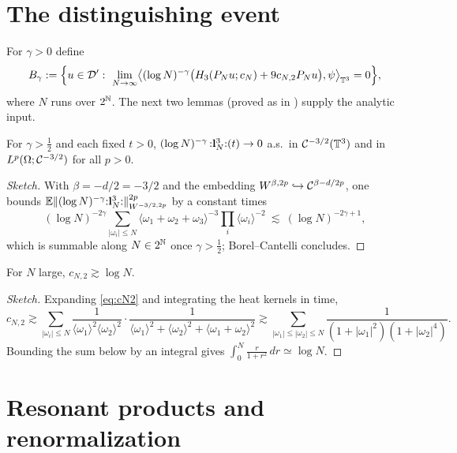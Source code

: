 \section*{The distinguishing event}

For $\gamma>0$ define
\[
B_\gamma:=\Bigl\{u\in\qoneD':\ \lim_{N\to\infty}\bigl\langle(\log N)^{-\gamma}\bigl(\qoneHp_3(\qonePN u;c_N)+9c_{N,2}\qonePN u\bigr),\psi\bigr\rangle_{\qoneT^3}=0\Bigr\},
\]
where $N$ runs over $2^{\mathbb{N}}$. The next two lemmas (proved as in
\cite[Lems.~3.11--3.12]{HKN24}) supply the analytic input.

\begin{qonelemma}\label{lem:cube}
For $\gamma>\tfrac12$ and each fixed $t>0$,
$(\log N)^{-\gamma}\,{:}\mathbf{l}_N^3{:}(t)\to0$ a.s.\ in $\mathcal{C}^{-3/2}(\mathbb{T}^3)$ and in
$L^p(\Omega;\mathcal{C}^{-3/2})$ for all $p>0$.
\end{qonelemma}

\begin{proof}[Sketch]
With $\beta=-d/2=-3/2$ and the embedding $W^{\beta,2p}\hookrightarrow
\mathcal{C}^{\beta-d/2p}$, one bounds
$\mathbb{E}\|(\log N)^{-\gamma}{:}\mathbf{l}_N^3{:}\|_{W^{-3/2,2p}}^{2p}$ by a constant times
\[
(\log N)^{-2\gamma}\sum_{|\omega_i|\le N}\langle\omega_1+\omega_2+\omega_3\rangle^{-3}\prod_{i}\langle\omega_i\rangle^{-2}
\ \lesssim\ (\log N)^{-2\gamma+1},
\]
which is summable along $N\in2^{\mathbb{N}}$ once $\gamma>\tfrac12$; Borel--Cantelli
concludes.
\end{proof}

\begin{qonelemma}\label{lem:logdiv}
For $N$ large, $c_{N,2}\gtrsim\log N$.
\end{qonelemma}

\begin{proof}[Sketch]
Expanding \eqref{eq:cN2} and integrating the heat kernels in time,
\[
c_{N,2}\gtrsim\sum_{|\omega_i|\le N}\frac{1}{\langle\omega_1\rangle^2\langle\omega_2\rangle^2}\cdot\frac{1}{\langle\omega_1\rangle^2+\langle\omega_2\rangle^2+\langle\omega_1+\omega_2\rangle^2}
\gtrsim\sum_{|\omega_1|\le|\omega_2|\le N}\frac{1}{(1+|\omega_1|^2)(1+|\omega_2|^4)}.
\]
Bounding the sum below by an integral gives
$\int_0^N\frac{r}{1+r^2}\,dr\simeq\log N$.
\end{proof}

\section*{Resonant products and renormalization}

